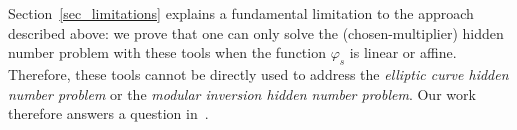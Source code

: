 \documentclass[11pt]{article}
\theoremstyle{definition}
\newcommand{\Z}{\mathbb{Z}}
\begin{document}
Section~\ref{sec_limitations} explains a fundamental limitation to the approach described above: we prove that one can only solve the (chosen-multiplier) hidden number problem with these tools when the function $\varphi_s$ is linear or affine.
Therefore, these tools cannot be directly used to address the \emph{elliptic curve hidden number problem} or the \emph{modular inversion hidden number problem}. Our work therefore answers a question in~\cite{MIHNP}.





\end{document}

